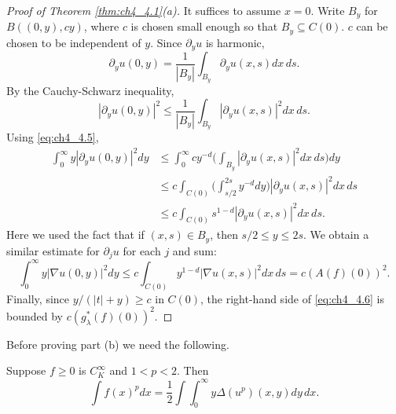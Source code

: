 \begin{proof}[Proof of Theorem \ref{thm:ch4_4.1}(a)]
It suffices to assume $x = 0$. Write $B_y$ for $B((0,y), cy)$, where $c$ is chosen small enough so that $B_y \subseteq C(0)$. $c$ can be chosen to be independent of $y$. Since $\partial_y u$ is harmonic,
\mpagebreak
\[
    \partial_y u(0,y) = \frac{1}{|B_y|} \int_{B_y} \partial_y u(x,s)dx\,ds.
\]
By the Cauchy-Schwarz inequality,
\begin{equation}\label{eq:ch4_4.5}
    |\partial_y u(0,y)|^2 \leq \frac{1}{|B_y|} \int_{B_y} |\partial_y u(x,s)|^2dx\,ds.
\end{equation}
Using \eqref{eq:ch4_4.5},
\begin{align*}
    \int_0^\infty y|\partial_y u(0,y)|^2dy &\leq \int_0^\infty cy^{-d}\Big(\int_{B_y} |\partial_y u(x,s)|^2dx\,ds\Big)dy \\
    &\leq c \int_{C(0)} \Big(\int_{s/2}^{2s} y^{-d}dy\Big)|\partial_y u(x,s)|^2dx\,ds \\
    &\leq c \int_{C(0)} s^{1-d}|\partial_y u(x,s)|^2dx\,ds.
\end{align*}
Here we used the fact that if $(x,s) \in B_y$, then $s/2 \leq y \leq 2s$. We obtain a similar estimate for $\partial_j u$ for each $j$ and sum:
\begin{equation}\label{eq:ch4_4.6}
    \int_0^\infty y|\nabla u(0,y)|^2dy \leq c \int_{C(0)} y^{1-d}|\nabla u(x,s)|^2dx\,ds = c(A(f)(0))^2.
\end{equation}
Finally, since $y/(|t|+y) \geq c$ in $C(0)$, the right-hand side of \eqref{eq:ch4_4.6} is bounded by $c(g_\lambda^*(f)(0))^2$.
\end{proof}

Before proving part (b) we need the following.

\begin{lemma}\label{lem:ch4_4.2}
Suppose $f \geq 0$ is $C_K^\infty$ and $1 < p < 2$. Then
\[
    \int f(x)^p dx = \frac{1}{2} \int \int_0^\infty y\Delta(u^p)(x,y)dy\,dx.
\]
\end{lemma}


